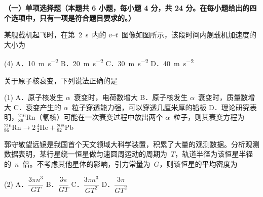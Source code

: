 

\textbf{（一）单项选择题（本题共 6 小题，每小题 4 分，共 24 分。在每小题给出的四个选项中，只有一项是符合题目要求的。）}

\begin{question}
某舰载机起飞时，在第~2~s~内的 $v$--$t$~图像如图所示，该段时间内舰载机加速度的大小为\gkblank

\begin{gkopts}(4)
  \task A．\SI{10}{\metre\per\second\squared}
  \task B．\SI{20}{\metre\per\second\squared}
  \task C．\SI{30}{\metre\per\second\squared}
  \task D．\SI{40}{\metre\per\second\squared}
\end{gkopts}

\end{question}

\begin{question}
关于原子核衰变，下列说法正确的是\gkblank

\begin{gkopts}(1)
  \task A．原子核发生 $\alpha$~衰变时，电荷数增大
  \task B．原子核发生 $\alpha$~衰变时，质量数增大
  \task C．衰变产生的 $\alpha$~粒子穿透能力强，可以穿透几厘米厚的铅板
  \task D．理论研究表明，${}_{86}^{216}\mathrm{Rn}$（氡核）可能在一次衰变过程中放出两个 $\alpha$~粒子，则其衰变方程为
        ${}_{86}^{216}\mathrm{Rn} \to 2\,{}_{2}^{4}\mathrm{He} + {}_{82}^{208}\mathrm{Pb}$
\end{gkopts}
\end{question}

\begin{question}
郭守敬望远镜是我国首个天文领域大科学装置，积累了大量的观测数据。分析观测数据表明，某行星绕一恒星做匀速圆周运动的周期为~$T$，轨道半径为该恒星半径的~$n$~倍。不考虑其他星体的影响，引力常量为~$G$，则该恒星的平均密度为\gkblank

\begin{gkopts}(2)
  \task A．$\dfrac{3\pi n^{3}}{GT}$
  \task B．$\dfrac{3\pi}{GT}$
  \task C．$\dfrac{3\pi n^{3}}{GT^{2}}$
  \task D．$\dfrac{3\pi}{GT^{2}}$
\end{gkopts}
\end{question}

